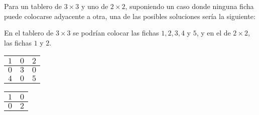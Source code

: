 \documentclass[11pt, a4paper, twoside]{article}
\begin{document}
\begin{ejemplo}

  Para un tablero de $3\times 3$ y uno de $2\times 2$, suponiendo un caso  donde
  ninguna ficha puede colocarse adyacente a otra, una de las posibles  soluciones
  sería la siguiente:

  En el tablero de $3\times 3$ se podrían colocar las fichas $1,2,3,4$  y $5$, y
  en el de $2\times 2$, las fichas $1$ y $2$.

  \begin{center}
      \begin{minipage}{0.2\textwidth}
          \begin{tabular}{|c|c|c|}
              \hline
               $1$ & $0$ & $2$ \\
              \hline
               $0$ & $3$ & $0$  \\
              \hline 
               $4$ & $0$ & $5$ \\
              \hline
          \end{tabular}
      \end{minipage}
      \begin{minipage}{0.2\textwidth}
          \begin{tabular}{|c|c|}
              \hline
               $1$ & $0$ \\
              \hline
               $0$ & $2$ \\
              \hline
          \end{tabular}
      \end{minipage}
  \end{center}

\end{ejemplo}
\end{document}
